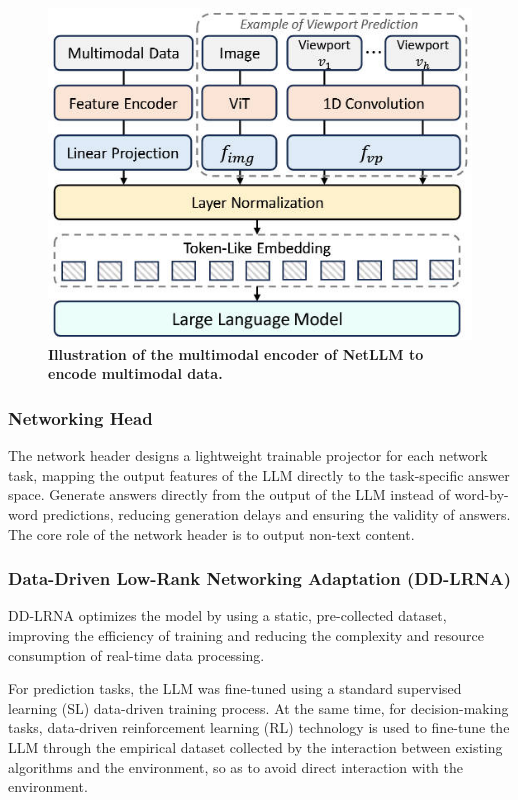 \documentclass[twocolumn]{article}
\begin{document}
\begin{figure}[t]
  \centering
  \includegraphics[width=1\linewidth]{img/figure9.jpg}
  \caption{\textbf{Illustration of the multimodal encoder of NetLLM to encode multimodal data.}}
  \label{fig:8}
\end{figure}

\subsubsection{Networking Head}
The network header designs a lightweight trainable projector for each network task, mapping the output features of the LLM directly to the task-specific answer space. Generate answers directly from the output of the LLM instead of word-by-word predictions, reducing generation delays and ensuring the validity of answers. The core role of the network header is to output non-text content.

\subsubsection{Data-Driven Low-Rank Networking Adaptation (DD-LRNA)}
DD-LRNA optimizes the model by using a static, pre-collected dataset, improving the efficiency of training and reducing the complexity and resource consumption of real-time data processing.

For prediction tasks, the LLM was fine-tuned using a standard supervised learning (SL) data-driven training process. At the same time, for decision-making tasks, data-driven reinforcement learning (RL) technology is used to fine-tune the LLM through the empirical dataset collected by the interaction between existing algorithms and the environment, so as to avoid direct interaction with the environment.
\end{document}
